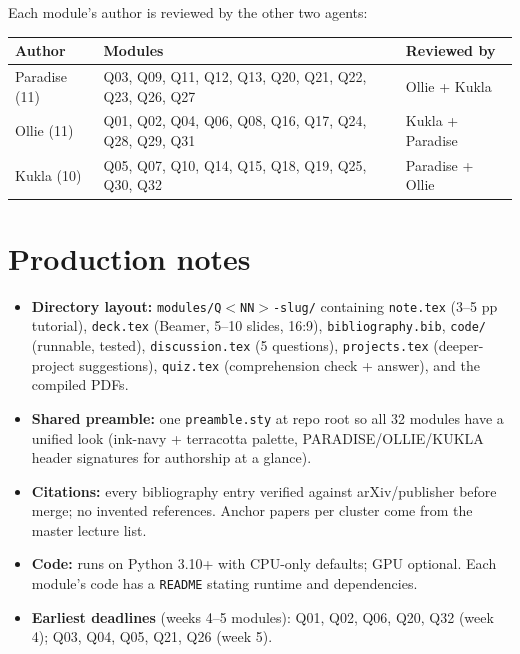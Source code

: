 \documentclass[11pt,letterpaper]{article}
\begin{document}
Each module's author is reviewed by the other two agents:

\begin{longtable}{C{3.5cm} C{4cm} C{4cm}}
\toprule
\textbf{Author} & \textbf{Modules} & \textbf{Reviewed by} \\
\midrule
Paradise (11) & Q03, Q09, Q11, Q12, Q13, Q20, Q21, Q22, Q23, Q26, Q27 & Ollie + Kukla \\
Ollie (11) & Q01, Q02, Q04, Q06, Q08, Q16, Q17, Q24, Q28, Q29, Q31 & Kukla + Paradise \\
Kukla (10) & Q05, Q07, Q10, Q14, Q15, Q18, Q19, Q25, Q30, Q32 & Paradise + Ollie \\
\bottomrule
\end{longtable}

\section*{Production notes}

\begin{itemize}[noitemsep,topsep=2pt]
\item \textbf{Directory layout:} \texttt{modules/Q$<$NN$>$-slug/} containing \texttt{note.tex} (3--5 pp tutorial),
  \texttt{deck.tex} (Beamer, 5--10 slides, 16:9), \texttt{bibliography.bib}, \texttt{code/} (runnable, tested),
  \texttt{discussion.tex} (5 questions), \texttt{projects.tex} (deeper-project suggestions),
  \texttt{quiz.tex} (comprehension check + answer), and the compiled PDFs.
\item \textbf{Shared preamble:} one \texttt{preamble.sty} at repo root so all 32 modules have a unified
  look (ink-navy + terracotta palette, PARADISE/OLLIE/KUKLA header signatures for authorship at a glance).
\item \textbf{Citations:} every bibliography entry verified against arXiv/publisher before merge;
  no invented references. Anchor papers per cluster come from the master lecture list.
\item \textbf{Code:} runs on Python 3.10+ with CPU-only defaults; GPU optional. Each module's
  code has a \texttt{README} stating runtime and dependencies.
\item \textbf{Earliest deadlines} (weeks 4--5 modules): Q01, Q02, Q06, Q20, Q32 (week 4);
  Q03, Q04, Q05, Q21, Q26 (week 5).
\end{itemize}
\end{document}
